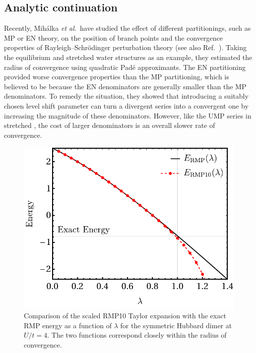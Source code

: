 \documentclass[aps,prb,reprint,noshowkeys,superscriptaddress]{revtex4-1}
\newcommand{\etal}{\textit{et al.}}
\begin{document}
\subsection{Analytic continuation}

Recently, Mih\'alka \etal\ have studied the effect of different partitionings, such as MP or EN theory, on the position of 
branch points and the convergence properties of Rayleigh--Schr\"odinger perturbation theory\cite{Mihalka_2017b} (see also
Ref.~).
Taking the equilibrium and stretched water structures as an example, they estimated the radius of convergence using quadratic
Pad\'e approximants.
The EN partitioning provided worse convergence properties than the MP partitioning, which is believed to be
because the EN denominators are generally smaller than the MP denominators.
To remedy the situation, they showed that introducing a suitably chosen level shift parameter can turn a 
divergent series into a convergent one by increasing the magnitude of these denominators.\cite{Mihalka_2017b}
However, like the UMP series in stretched ,\cite{Lepetit_1988} 
the cost of larger denominators is an overall slower rate of convergence.

\begin{figure}
    \includegraphics[width=\linewidth]{fig12}
    \caption{%
        Comparison of the scaled RMP10 Taylor expansion with the exact RMP energy as a function
        of $\lambda$ for the symmetric Hubbard dimer at $U/t = 4$. 
        The two functions correspond closely within the radius of convergence.
    }
    \label{fig:rmp_anal_cont}
\end{figure}
\end{document}
